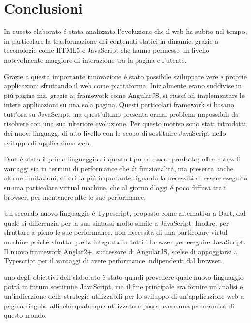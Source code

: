 
\chapter{Conclusioni}

In questo elaborato \'e stata analizzata l'evoluzione che il web ha subito nel tempo, in particolare la trasformazione dei contenuti statici in dinamici grazie a teconologie come HTML5 e JavaScript che hanno permesso un livello notevolmente maggiore di interazione tra la pagina e l'utente.

Grazie a questa importante innovazione \'e stato possibile sviluppare vere e proprie applicazioni sfruttando il web come piattaforma. Inizialmente erano suddivise in pi\'u pagine ma, grazie ai framework come AngularJS, si riusc\'i ad implementare le intere applicazioni su una sola pagina.
Questi particolari framework si basano tutt'ora su JavaScript, ma quest'ultimo presenta ormai problemi impossibili da risolvere con una sua ulteriore evoluzione.
Per questo motivo sono stati introdotti dei nuovi linguaggi di alto livello con lo scopo di sostituire JavaScript nello sviluppo di applicazione web.

Dart \'e stato il primo linguaggio di questo tipo ed essere prodotto; offre notevoli vantaggi sia in termini di performance che di funzionalit\'a, ma presenta anche alcune limitazioni, di cui la pi\'u importante riguarda la necessit\'a di essere eseguito su una particolare virtual machine, che al giorno d'oggi \'e poco diffusa tra i browser, per mentenere alte le sue performance.

Un secondo nuovo linguaggio \'e Typescript, proposto come alternativa a Dart, dal quale si differenzia per la sua sintassi molto simile a JavaScript.
Inoltre, per sfruttare a pieno le sue performance, non necessita di una particolare virtul machine poich\'e sfrutta quella integrata in tutti i browser per eseguire JavaScript.
Il nuovo framework Anglar2+, successore di AngularJS, scelse di appoggiarsi a Typescript per il vantaggi di avere performance indipendenti dal browser.


uno degli obiettivi dell'elaborato è stato quindi prevedere quale nuovo linguaggio potr\'a in futuro sostituire JavaScript, ma il fine principale era fornire un'analisi e un'indicazione delle strategie utilizzabili per lo sviluppo di un'applicazione web a pagina singola, affinchè qualunque utilizzatore possa avere una panoramica di questo mondo.